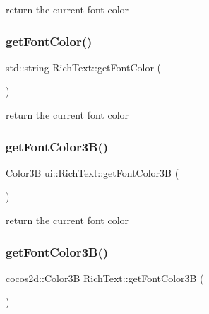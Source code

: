 return the current font color \mbox{\label{classui_1_1RichText_a9bfe97a06ce0d02b42d6709050e57bbc}} 
\subsubsection{\texorpdfstring{get\+Font\+Color()}{getFontColor()}\hspace{0.1cm}{\footnotesize\ttfamily [2/2]}}
{\footnotesize\ttfamily std\+::string Rich\+Text\+::get\+Font\+Color (\begin{DoxyParamCaption}{ }\end{DoxyParamCaption})}

return the current font color \mbox{\label{classui_1_1RichText_a45c8e3ddbf180a6eb4f9912494f6e5a8}} 
\subsubsection{\texorpdfstring{get\+Font\+Color3\+B()}{getFontColor3B()}\hspace{0.1cm}{\footnotesize\ttfamily [1/2]}}
{\footnotesize\ttfamily \hyperlink{structColor3B}{Color3B} ui\+::\+Rich\+Text\+::get\+Font\+Color3B (\begin{DoxyParamCaption}{ }\end{DoxyParamCaption})}

return the current font color \mbox{\label{classui_1_1RichText_a43e534f4c1307afa1f8ba91c9dee49c8}} 
\subsubsection{\texorpdfstring{get\+Font\+Color3\+B()}{getFontColor3B()}\hspace{0.1cm}{\footnotesize\ttfamily [2/2]}}
{\footnotesize\ttfamily cocos2d\+::\+Color3B Rich\+Text\+::get\+Font\+Color3B (\begin{DoxyParamCaption}{ }\end{DoxyParamCaption})}

